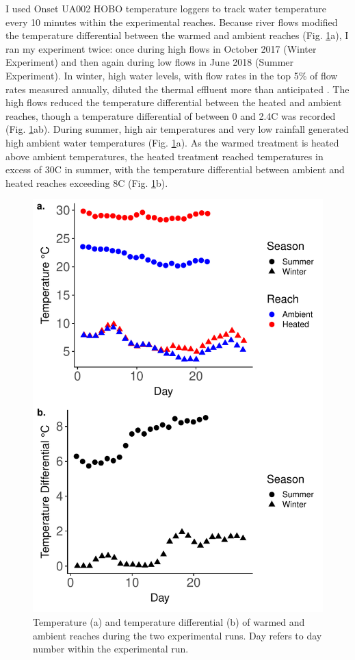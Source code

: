 I used Onset UA002 HOBO temperature loggers to track water temperature every 10 minutes within the experimental reaches. Because river flows modified the temperature differential between the warmed and ambient reaches (Fig. \ref{fig:shannontemp}a), I ran my experiment twice: once during high flows in October 2017 (Winter Experiment) and then again during low flows in June 2018 (Summer Experiment). In winter, high water levels, with flow rates in the top 5\% of flow rates measured annually, diluted the thermal effluent more than anticipated \citep{opw2018}. The high flows reduced the temperature differential between the heated and ambient reaches, though a temperature differential of between 0 and 2.4\degree C was recorded (Fig. \ref{fig:shannontemp}ab). During summer, high air temperatures and very low rainfall generated high ambient water temperatures (Fig. \ref{fig:shannontemp}a). As the warmed treatment is heated above ambient temperatures, the heated treatment reached temperatures in excess of 30\degree C in summer, with the temperature differential between ambient and heated reaches exceeding 8\degree C (Fig. \ref{fig:shannontemp}b). 

\begin{figure}%
    \centering
    \includegraphics[scale=0.9]{figures/ch5/shannontemp.pdf}
  \caption [Temperature of the experimental sites in the River Shannon]{Temperature (a) and temperature differential (b) of warmed and ambient reaches during the two experimental runs. Day refers to day number within the experimental run.} 
    \label{fig:shannontemp}
\end{figure}

